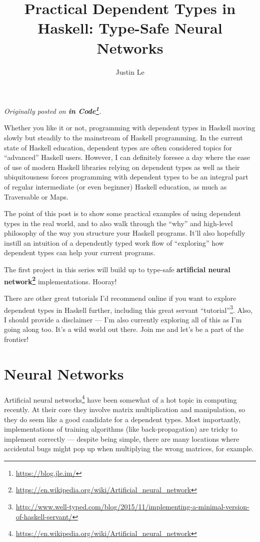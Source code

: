 \documentclass[]{article}
\title{Practical Dependent Types in Haskell: Type-Safe Neural Networks}
\author{Justin Le}
\renewcommand{\href}[2]{#2\footnote{\url{#1}}}
\begin{document}
\maketitle

\emph{Originally posted on \textbf{\href{https://blog.jle.im/}{in
Code}}.}

Whether you like it or not, programming with dependent types in Haskell
moving slowly but steadily to the mainstream of Haskell programming. In
the current state of Haskell education, dependent types are often
considered topics for ``advanced'' Haskell users. However, I can
definitely foresee a day where the ease of use of modern Haskell
libraries relying on dependent types as well as their ubiquitousness
forces programming with dependent types to be an integral part of
regular intermediate (or even beginner) Haskell education, as much as
Traversable or Maps.

The point of this post is to show some practical examples of using
dependent types in the real world, and to also walk through the ``why''
and high-level philosophy of the way you structure your Haskell
programs. It'll also hopefully instill an intuition of a dependently
typed work flow of ``exploring'' how dependent types can help your
current programs.

The first project in this series will build up to type-safe
\textbf{\href{https://en.wikipedia.org/wiki/Artificial_neural_network}{artificial
neural network}} implementations. Hooray!

There are other great tutorials I'd recommend online if you want to
explore dependent types in Haskell further, including
\href{http://www.well-typed.com/blog/2015/11/implementing-a-minimal-version-of-haskell-servant/}{this
great servant ``tutorial''}. Also, I should provide a disclaimer --- I'm
also currently exploring all of this as I'm going along too. It's a wild
world out there. Join me and let's be a part of the frontier!

\section{Neural Networks}\label{neural-networks}

\href{https://en.wikipedia.org/wiki/Artificial_neural_network}{Artificial
neural networks} have been somewhat of a hot topic in computing
recently. At their core they involve matrix multiplication and
manipulation, so they do seem like a good candidate for a dependent
types. Most importantly, implementations of training algorithms (like
back-propagation) are tricky to implement correctly --- despite being
simple, there are many locations where accidental bugs might pop up when
multiplying the wrong matrices, for example.
\end{document}
